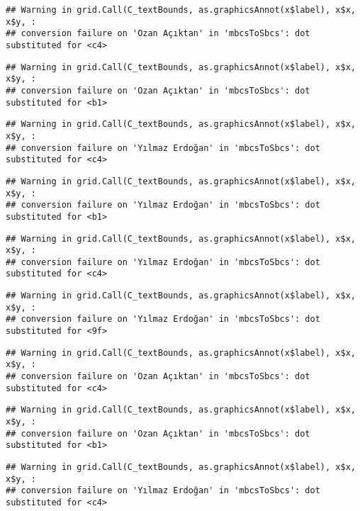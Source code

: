 \documentclass[
]{article}
\begin{document}
\begin{verbatim}
## Warning in grid.Call(C_textBounds, as.graphicsAnnot(x$label), x$x, x$y, :
## conversion failure on 'Ozan Açıktan' in 'mbcsToSbcs': dot substituted for <c4>
\end{verbatim}

\begin{verbatim}
## Warning in grid.Call(C_textBounds, as.graphicsAnnot(x$label), x$x, x$y, :
## conversion failure on 'Ozan Açıktan' in 'mbcsToSbcs': dot substituted for <b1>
\end{verbatim}

\begin{verbatim}
## Warning in grid.Call(C_textBounds, as.graphicsAnnot(x$label), x$x, x$y, :
## conversion failure on 'Yılmaz Erdoğan' in 'mbcsToSbcs': dot substituted for <c4>
\end{verbatim}

\begin{verbatim}
## Warning in grid.Call(C_textBounds, as.graphicsAnnot(x$label), x$x, x$y, :
## conversion failure on 'Yılmaz Erdoğan' in 'mbcsToSbcs': dot substituted for <b1>
\end{verbatim}

\begin{verbatim}
## Warning in grid.Call(C_textBounds, as.graphicsAnnot(x$label), x$x, x$y, :
## conversion failure on 'Yılmaz Erdoğan' in 'mbcsToSbcs': dot substituted for <c4>
\end{verbatim}

\begin{verbatim}
## Warning in grid.Call(C_textBounds, as.graphicsAnnot(x$label), x$x, x$y, :
## conversion failure on 'Yılmaz Erdoğan' in 'mbcsToSbcs': dot substituted for <9f>
\end{verbatim}

\begin{verbatim}
## Warning in grid.Call(C_textBounds, as.graphicsAnnot(x$label), x$x, x$y, :
## conversion failure on 'Ozan Açıktan' in 'mbcsToSbcs': dot substituted for <c4>
\end{verbatim}

\begin{verbatim}
## Warning in grid.Call(C_textBounds, as.graphicsAnnot(x$label), x$x, x$y, :
## conversion failure on 'Ozan Açıktan' in 'mbcsToSbcs': dot substituted for <b1>
\end{verbatim}

\begin{verbatim}
## Warning in grid.Call(C_textBounds, as.graphicsAnnot(x$label), x$x, x$y, :
## conversion failure on 'Yılmaz Erdoğan' in 'mbcsToSbcs': dot substituted for <c4>
\end{verbatim}
\end{document}
